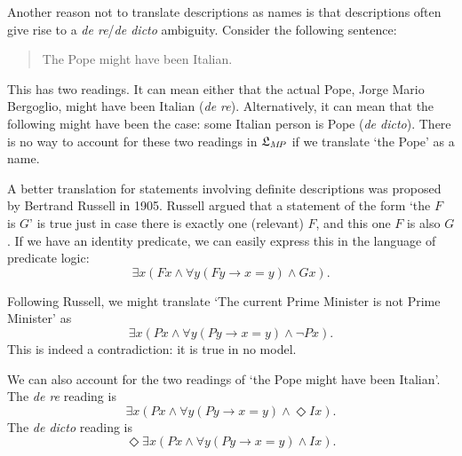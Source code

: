 Another reason not to translate descriptions as names is that descriptions often
give rise to a \emph{de re}/\emph{de dicto} ambiguity. Consider the following
sentence:
\begin{quote}
  The Pope might have been Italian.
\end{quote}
This has two readings. It can mean either that the actual Pope, Jorge Mario
Bergoglio, might have been Italian (\emph{de re}). Alternatively, it can mean
that the following might have been the case: some Italian person is Pope
(\emph{de dicto}). There is no way to account for these two readings in
$\mathfrak{L}_{M\!P}$ if we translate `the Pope' as a name. 

A better translation for statements involving definite descriptions was proposed
by Bertrand Russell in 1905. Russell argued that a statement of the form `the
$F$ is $G$' is true just in case there is exactly one (relevant) $F$, and
this one $F$ is also $G$. If we have an identity predicate, we can easily
express this in the language of predicate logic:
\[
  \exists x(Fx \land \forall y(Fy \to x\!=\!y) \land Gx). 
\]

Following Russell, we might translate `The current Prime Minister is not Prime
Minister' as
\[
  \exists x(Px \land \forall y(Py \to x\!=\!y) \land \neg Px).
\]
This is indeed a contradiction: it is true in no model.

We can also account for the two readings of `the Pope might have been Italian'.
The \emph{de re} reading is
\[
  \exists x (Px \land \forall y(Py \to x\!=\!y) \land \Diamond Ix).
\]
The \emph{de dicto} reading is
\[
  \Diamond \exists x (Px \land \forall y(Py \to x\!=\!y) \land Ix).
\]



